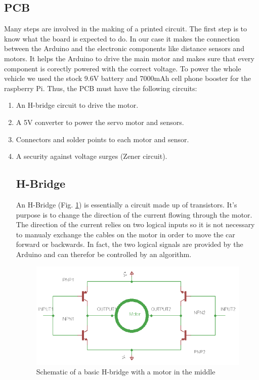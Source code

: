 \documentclass[a4paper,11pt]{report}
\begin{document}
{\begin{enumerate}
\section{PCB}
Many steps are involved in the making of a printed circuit. The first step is
to know what the board is expected to do. In our case it makes the connection
between the Arduino and the electronic components like distance sensors and
motors. It helps the Arduino to drive the main motor and makes sure that every
component is corectly powered with the correct voltage. To power the whole
vehicle we used the stock 9.6V battery and 7000mAh cell phone booster for the
raspberry Pi.
Thus, the PCB must have the following circuits:
\begin{enumerate}
\item An H-bridge circuit to drive the motor.
\item A 5V converter to power the servo motor and sensors.
\item Connectors and solder points to each motor and sensor.
\item A security against voltage surges (Zener circuit).

\subsection{H-Bridge}
An H-Bridge (Fig. \ref{H-bridge}) is essentially a circuit made up of transistors. It's purpose is
to change the direction of the current flowing through the motor. The
direction of the current relies on two logical inputs so it is not necessary
to manualy exchange the cables on the motor in order to move the car forward
or backwards. In fact, the two logical signals are provided by the Arduino and
can therefor be controlled by an algorithm.

\begin{figure}[h]
\centering
\includegraphics[width=1.0\textwidth]{H-bridge}
    \caption[H-Bridge]{\label{H-bridge}Schematic of a basic H-bridge with a
      motor in the middle}
\end{figure} 


\end{enumerate}
\end{enumerate}}
\end{document}
